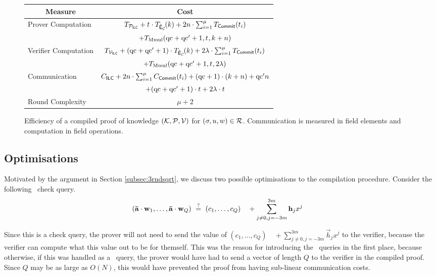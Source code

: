 \begin{figure}[!h]
\begin{tabular}{|l|c|}
\hline
\multicolumn{1}{|c|}{\bf Measure} & {\bf Cost} \\
\hline
Prover Computation & $T_{\mathcal{P}_{\mathsf{ILC}}} + {t_{}} \cdot T_{\tilde{\mathsf{E}}_{\mathcal{C}}\!}(k) + 2n\cdot \sum_{i=1}^{\mu} T_{\mathsf{Commit}}(t_i)$ \\
&$ + T_{\text{Mmul}}(\mathrm{qc}+\mathrm{qc}'+1,{t_{}},k+n)$ \\
\hline
Verifier Computation & $T_{\mathcal{V}_{\mathsf{ILC}}} + (\mathrm{qc}+\mathrm{qc}'+1)\cdot T_{\tilde{\mathsf{E}}_{\mathcal{C}}\!}(k) + 2\lambda \cdot \sum_{i=1}^{\mu} T_{\mathsf{Commit}}(t_i)$ \\
& $+ T_{\text{Mmul}}(\mathrm{qc}+\mathrm{qc}'+1,{t_{}},2\lambda)$\\
\hline
Communication & $C_{\mathsf{ILC}} + 2n\cdot \sum_{i=1}^{\mu} C_{\mathsf{Commit}}(t_i) + (\mathrm{qc}+1)\cdot(k+n)+\mathrm{qc}' n$ \\
& $+(\mathrm{qc}+\mathrm{qc}'+1)\cdot t+ 2\lambda\cdot t$ \\
\hline
Round Complexity & $\mu + 2$ \\
\hline
\end{tabular}
\caption{Efficiency of a compiled proof of knowledge $(\mathcal{K},\mathcal{P},\mathcal{V})$ for $(\mathsf{\sigma},u,w)\in \mathcal{R}$. Communication is measured in field elements and computation in field operations.}\label{fig:IOPeff}
\end{figure}

\subsection{Optimisations}\label{subsec:ipcpopt}

Motivated by the argument in Section \ref{subsec:3rndsqrt}, we discuss two possible optimisations to the compilation procedure. Consider the following \ILC\ check query.
\begin{align*}
\left(\mathbf{\bar{a}}\cdot \mathbf{w}_1,\ldots,\mathbf{\bar{a}}\cdot \mathbf{w}_Q \right) ~&\overset{?}{=}~ (c_1,\ldots,c_Q) \quad + \sum_{j\neq 0,j=-3m}^{3m} \mathbf{h}_j {x^j}
\end{align*}

Since this is a check query, the prover will not need to send the value of $(c_1,\ldots,c_Q) \quad + \sum_{j\neq 0,j=-3m}^{3m} \vec{h}_j {x^j}$ to the verifier, because the verifier can compute what this value out to be for themself. This was the reason for introducing the \ILCcheck\ queries in the first place, because otherwise, if this was handled as a \ILCsend\ query, the prover would have had to send a vector of length $Q$ to the verifier in the compiled proof. Since $Q$ may be as large as $O(N)$, this would have prevented the proof from having sub-linear communication costs.

